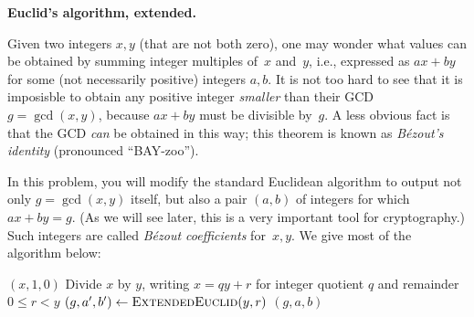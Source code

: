 \documentclass[11pt,addpoints]{exam}
\begin{document}
\begin{questions}
  
  \question \textbf{Euclid's algorithm, extended.}
  
  Given two integers $x,y$ (that are not both zero), one may wonder what values can be obtained by summing integer multiples of~$x$ and~$y$, i.e., expressed as $ax+by$ for some (not necessarily positive) integers $a,b$.
  It is not too hard to see that it is imposisble to obtain any positive integer \emph{smaller} than their GCD $g = \gcd(x,y)$, because $ax+by$ must be divisible by~$g$.
  A less obvious fact is that the GCD \emph{can} be obtained in this way; this theorem is known as \emph{B\'{e}zout's identity} (pronounced ``BAY-zoo'').
    
  In this problem, you will modify the standard Euclidean algorithm to output not only $g=\gcd(x,y)$ itself, but also a pair $(a,b)$ of integers for which $ax+by = g$.
  (As we will see later, this is a very important tool for cryptography.)
  Such integers are called \emph{B\'{e}zout coefficients} for~$x,y$.
  We give most of the algorithm below:
    
  \begin{center}
    \begin{minipage}{\linewidth}
      \begin{algorithm}[H]
        \begin{algorithmic}[1]
            \Statex
             \State \Return $(x,1,0)$
            \Else \State Divide $x$ by $y$, writing $x = qy + r$ for integer quotient $q$ and remainder $0\leq r < y$
            \State $(g,a',b') \gets \Call{ExtendedEuclid}{y,r}$
            \State \Return $(g, a, b)$
            \EndIf
            \EndFunction
        \end{algorithmic}
      \end{algorithm}
    \end{minipage}
  \end{center}


\end{questions}
\end{document}
